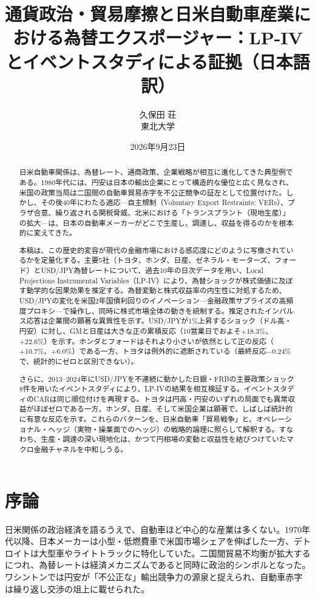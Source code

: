 \documentclass[12pt,a4paper]{article}
\title{通貨政治・貿易摩擦と日米自動車産業における為替エクスポージャー：LP-IVとイベントスタディによる証拠（日本語訳）}
\author{久保田 荘\\東北大学}
\date{2026年9月23日}
\begin{document}
\maketitle

\begin{abstract}
日米自動車関係は、為替レート、通商政策、企業戦略が相互に進化してきた典型例である。1980年代には、円安は日本の輸出企業にとって構造的な優位と広く見なされ、米国の政策当局は二国間の自動車貿易赤字を不公正競争の証左として位置付けた。しかし、その後40年にわたる適応---自主規制（Voluntary Export Restraints: VERs）、プラザ合意、繰り返される関税脅威、北米における「トランスプラント（現地生産）」の拡大---は、日本の自動車メーカーがどこで生産し、調達し、収益を得るのかを根本的に変えてきた。

本稿は、この歴史的変容が現代の金融市場における感応度にどのように写像されているかを定量化する。主要5社（トヨタ、ホンダ、日産、ゼネラル・モーターズ、フォード）とUSD/JPY為替レートについて、過去10年の日次データを用い、Local Projections Instrumental Variables（LP-IV）により、為替ショックが株式価値に及ぼす動学的な因果効果を推定する。為替変動と株式収益率の内生性に対処するため、USD/JPYの変化を米国2年国債利回りのイノベーション---金融政策サプライズの高頻度プロキシ---で操作し、同時に株式市場全体の動きを統制する。推定されたインパルス応答は企業間の顕著な異質性を示す。USD/JPYが1\%上昇するショック（ドル高・円安）に対し、GMと日産は大きな正の累積反応（10営業日でおよそ$+18.3\%$、$+22.6\%$）を示す。ホンダとフォードはそれより小さいが依然として正の反応（$+10.7\%$、$+6.0\%$）である一方、トヨタは例外的に遮断されている（最終反応$-0.24\%$で、統計的にゼロと区別できない）。

さらに、2013--2024年にUSD/JPYを不連続に動かした日銀・FRBの主要政策ショック8件を用いたイベントスタディにより、LP-IVの結果を相互検証する。イベントスタディのCARは同じ順位付けを再現する。トヨタは円高・円安のいずれの局面でも異常収益がほぼゼロである一方、ホンダ、日産、そして米国企業は顕著で、しばしば統計的に有意な反応を示す。これらのパターンを、日米自動車「貿易戦争」と、オペレーショナル・ヘッジ（実物・操業面でのヘッジ）の戦略的論理に照らして解釈する。すなわち、生産・調達の深い現地化は、かつて円相場の変動と収益性を結びつけていたマクロ金融チャネルを中和しうる。
\end{abstract}

\section{序論}

日米関係の政治経済を語るうえで、自動車ほど中心的な産業は多くない。1970年代以降、日本メーカーは小型・低燃費車で米国市場シェアを伸ばした一方、デトロイトは大型車やライトトラックに特化していた。二国間貿易不均衡が拡大するにつれ、為替レートは経済メカニズムであると同時に政治的シンボルとなった。ワシントンでは円安が「不公正な」輸出競争力の源泉と捉えられ、自動車赤字は繰り返し交渉の俎上に載せられた。
\end{document}
